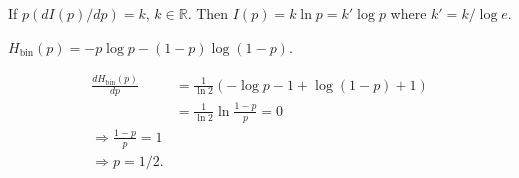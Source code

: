 If $p (d I(p) / d p) = k$, $k \in \mathds{R}$.
Then $I(p) = k \ln p = k' \log p$ where $k' = k / \log e$.



$H_{\text{bin}}(p) = - p\log p - (1-p) \log (1-p)$.

\begin{align}
    \frac{d H_{\text{bin}}(p)}{d p}
        &= \frac{1}{\ln 2} \left( - \log p - 1 + \log (1-p) + 1 \right)\\
        &= \frac{1}{\ln 2} \ln \frac{1-p}{p} = 0\\
    \Rightarrow \frac{1-p}{p} = 1\\
    \Rightarrow p = 1/2.
\end{align}



